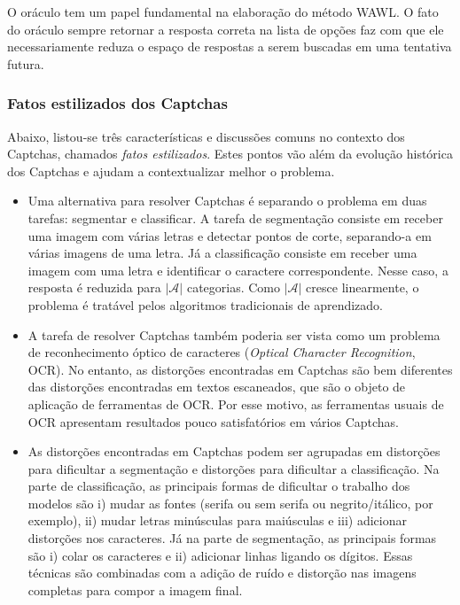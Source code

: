 \documentclass[12pt,twoside,brazilian]{book}
\begin{document}
O oráculo tem um papel fundamental na elaboração do método WAWL. O fato
do oráculo sempre retornar a resposta correta na lista de opções faz com
que ele necessariamente reduza o espaço de respostas a serem buscadas em
uma tentativa futura.

\hypertarget{fatos-estilizados-dos-captchas}{%
\subsubsection{Fatos estilizados dos
Captchas}\label{fatos-estilizados-dos-captchas}}

Abaixo, listou-se três características e discussões comuns no contexto
dos Captchas, chamados \emph{fatos estilizados}. Estes pontos vão além
da evolução histórica dos Captchas e ajudam a contextualizar melhor o
problema.

\begin{itemize}
\item
  Uma alternativa para resolver Captchas é separando o problema em duas
  tarefas: segmentar e classificar. A tarefa de segmentação consiste em
  receber uma imagem com várias letras e detectar pontos de corte,
  separando-a em várias imagens de uma letra. Já a classificação
  consiste em receber uma imagem com uma letra e identificar o caractere
  correspondente. Nesse caso, a resposta é reduzida para
  \(|\mathcal A|\) categorias. Como \(|\mathcal A|\) cresce linearmente,
  o problema é tratável pelos algoritmos tradicionais de aprendizado.
\item
  A tarefa de resolver Captchas também poderia ser vista como um
  problema de reconhecimento óptico de caracteres (\emph{Optical
  Character Recognition}, OCR). No entanto, as distorções encontradas em
  Captchas são bem diferentes das distorções encontradas em textos
  escaneados, que são o objeto de aplicação de ferramentas de OCR. Por
  esse motivo, as ferramentas usuais de OCR apresentam resultados pouco
  satisfatórios em vários Captchas.
\item
  As distorções encontradas em Captchas podem ser agrupadas em
  distorções para dificultar a segmentação e distorções para dificultar
  a classificação. Na parte de classificação, as principais formas de
  dificultar o trabalho dos modelos são i) mudar as fontes (serifa ou
  sem serifa ou negrito/itálico, por exemplo), ii) mudar letras
  minúsculas para maiúsculas e iii) adicionar distorções nos caracteres.
  Já na parte de segmentação, as principais formas são i) colar os
  caracteres e ii) adicionar linhas ligando os dígitos. Essas técnicas
  são combinadas com a adição de ruído e distorção nas imagens completas
  para compor a imagem final.
\end{itemize}
\end{document}
